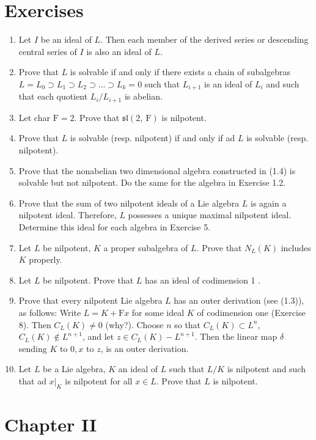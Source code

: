\documentclass[10pt]{article}
\begin{document}
\section*{Exercises}
\begin{enumerate}
  \item Let $I$ be an ideal of $L$. Then each member of the derived series or descending central series of $I$ is also an ideal of $L$.
  \item Prove that $L$ is solvable if and only if there exists a chain of subalgebras $L=L_{0} \supset L_{1} \supset L_{2} \supset \ldots \supset L_{k}=0$ such that $L_{i+1}$ is an ideal of $L_{i}$ and such that each quotient $L_{i} / L_{i+1}$ is abelian.
  \item Let char $\mathrm{F}=2$. Prove that $\mathfrak{s l}(2, \mathrm{~F})$ is nilpotent.
  \item Prove that $L$ is solvable (resp. nilpotent) if and only if ad $L$ is solvable (resp. nilpotent).
  \item Prove that the nonabelian two dimensional algebra constructed in (1.4) is solvable but not nilpotent. Do the same for the algebra in Exercise 1.2.
  \item Prove that the sum of two nilpotent ideals of a Lie algebra $L$ is again a nilpotent ideal. Therefore, $L$ possesses a unique maximal nilpotent ideal. Determine this ideal for each algebra in Exercise 5.
  \item Let $L$ be nilpotent, $K$ a proper subalgebra of $L$. Prove that $N_{L}(K)$ includes $K$ properly.
  \item Let $L$ be nilpotent. Prove that $L$ has an ideal of codimension 1 .
  \item Prove that every nilpotent Lie algebra $L$ has an outer derivation (see (1.3)), as follows: Write $L=K+\mathrm{F} x$ for some ideal $K$ of codimension one (Exercise 8). Then $C_{L}(K) \neq 0$ (why?). Choose $n$ so that $C_{L}(K) \subset L^{n}$, $C_{L}(K) \notin L^{n+1}$, and let $z \in C_{L}(K)-L^{n+1}$. Then the linear map $\delta$ sending $K$ to $0, x$ to $z$, is an outer derivation.
  \item Let $L$ be a Lie algebra, $K$ an ideal of $L$ such that $L / K$ is nilpotent and such that ad $\left.x\right|_{K}$ is nilpotent for all $x \in L$. Prove that $L$ is nilpotent.
\end{enumerate}

\section*{Chapter II}
\end{document}
